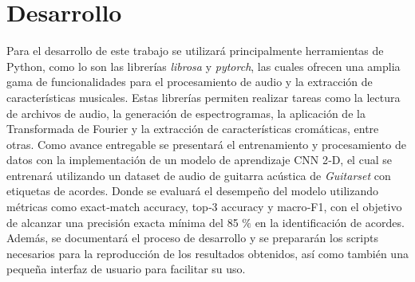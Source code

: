 \section{Desarrollo}
Para el desarrollo de este trabajo se utilizará principalmente herramientas de Python, como lo son las librerías \textit{librosa} y \textit{pytorch}, las cuales ofrecen una amplia gama de funcionalidades para el procesamiento de audio y la extracción de características musicales. Estas librerías permiten realizar tareas como la lectura de archivos de audio, la generación de espectrogramas, la aplicación de la Transformada de Fourier y la extracción de características cromáticas, entre otras.
Como avance entregable se presentará el entrenamiento y procesamiento de datos con la implementación de un modelo de aprendizaje CNN 2‑D, el cual se entrenará utilizando un dataset de audio de guitarra acústica de \textit{Guitarset} con etiquetas de acordes. Donde se evaluará el desempeño del modelo utilizando métricas como exact‑match accuracy, top‑3 accuracy y macro‑F1, con el objetivo de alcanzar una precisión exacta mínima del 85 $\%$ en la identificación de acordes. Además, se documentará el proceso de desarrollo y se prepararán los scripts necesarios para la reproducción de los resultados obtenidos, así como también una pequeña interfaz de usuario para facilitar su uso.